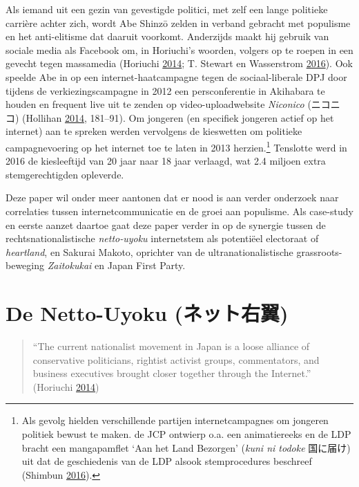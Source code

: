 \documentclass[10.5pt,dutch,]{article}
\begin{document}
Als iemand uit een gezin van gevestigde politici, met zelf een lange
politieke carrière achter zich, wordt Abe Shinzō zelden in verband
gebracht met populisme en het anti-elitisme dat daaruit voorkomt.
Anderzijds maakt hij gebruik van sociale media als Facebook om, in
Horiuchi's woorden, volgers op te roepen in een gevecht tegen massamedia
(Horiuchi \protect\hyperlink{ref-horiuchiux5fpublicux5f2014}{2014}; T.
Stewart en Wasserstrom
\protect\hyperlink{ref-t.ux5fstewartux5fglobalux5f2016}{2016}). Ook
speelde Abe in op een internet-haatcampagne tegen de sociaal-liberale
DPJ door tijdens de verkiezingscampagne in 2012 een persconferentie in
Akihabara te houden en frequent live uit te zenden op
video-uploadwebsite \emph{Niconico} (ニコニコ) (Hollihan
\protect\hyperlink{ref-hollihanux5fdisputeux5f2014}{2014}, 181--91). Om
jongeren (en specifiek jongeren actief op het internet) aan te spreken
werden vervolgens de kieswetten om politieke campagnevoering op het
internet toe te laten in 2013 herzien.\footnote{Als gevolg hielden
  verschillende partijen internetcampagnes om jongeren politiek bewust
  te maken. de JCP ontwierp o.a. een animatiereeks en de LDP bracht een
  mangapamflet `Aan het Land Bezorgen' (\emph{kuni ni todoke} 国に届け)
  uit dat de geschiedenis van de LDP alsook stemprocedures beschreef
  (Shimbun
  \protect\hyperlink{ref-asahiux5fshimbunux5felectionsux5f2016}{2016}).}
Tenslotte werd in 2016 de kiesleeftijd van 20 jaar naar 18 jaar
verlaagd, wat 2.4 miljoen extra stemgerechtigden opleverde.

Deze paper wil onder meer aantonen dat er nood is aan verder onderzoek
naar correlaties tussen internetcommunicatie en de groei aan populisme.
Als case-study en eerste aanzet daartoe gaat deze paper verder in op de
synergie tussen de rechtsnationalistische \emph{netto-uyoku}
internetstem als potentiëel electoraat of \emph{heartland}, en Sakurai
Makoto, oprichter van de ultranationalistische grassroots-beweging
\emph{Zaitokukai} en Japan First Party.

\newpage

\section{De Netto-Uyoku
(ネット右翼)}\label{de-netto-uyoku-ux30cdux30c3ux30c8ux53f3ux7ffc}

\begin{quote}
``The current nationalist movement in Japan is a loose alliance of
conservative politicians, rightist activist groups, commentators, and
business executives brought closer together through the Internet.''
(Horiuchi \protect\hyperlink{ref-horiuchiux5fpublicux5f2014}{2014})
\end{quote}
\end{document}
